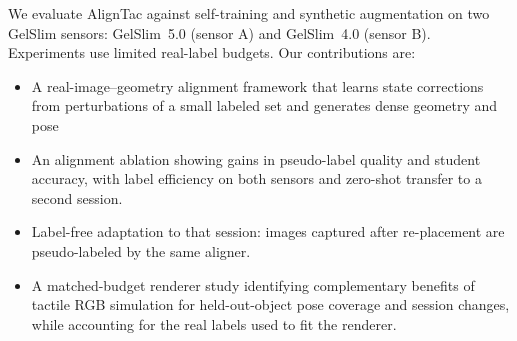 We evaluate AlignTac against self-training and synthetic augmentation on two GelSlim sensors: GelSlim~5.0 (sensor A) and GelSlim~4.0 (sensor B). Experiments use limited real-label budgets. Our contributions are:
\begin{itemize}
    \item A real-image--geometry alignment framework that learns state corrections from perturbations of a small labeled set and generates dense geometry and pose 
    \item An alignment ablation showing gains in pseudo-label quality and student accuracy, with label efficiency on both sensors and zero-shot transfer to a second session.
    \item Label-free adaptation to that session: images captured after re-placement are pseudo-labeled by the same aligner.
    \item A matched-budget renderer study identifying complementary benefits of tactile RGB simulation for held-out-object pose coverage and session changes, while accounting for the real labels used to fit the renderer.
\end{itemize}
